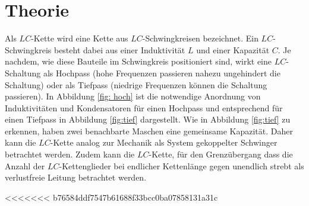 \section{Theorie}
\label{sec:Theorie}
Als $LC$-Kette wird eine Kette aus $LC$-Schwingkreisen bezeichnet.
Ein $LC$-Schwingkreis besteht dabei aus einer Induktivität $L$ und einer Kapazität $C$. Je nachdem, wie diese Bauteile
im Schwingkreis positioniert sind, wirkt eine $LC$-Schaltung als Hochpass (hohe Frequenzen passieren nahezu ungehindert die Schaltung)
oder als Tiefpass (niedrige Frequenzen können die Schaltung passieren).
In Abbildung \ref{fig: hoch} ist die notwendige Anordnung von Induktivitäten
und Kondensatoren für einen Hochpass und entsprechend für einen Tiefpass in Abbildung \ref{fig:tief} dargestellt.
Wie in Abbildung \ref{fig:tief} zu erkennen, haben zwei benachbarte Maschen eine gemeinsame Kapazität. Daher kann die $LC$-Kette analog zur
Mechanik als System gekoppelter Schwinger betrachtet werden.
Zudem kann die $LC$-Kette, für den Grenzübergang dass die Anzahl der $LC$-Kettenglieder bei endlicher Kettenlänge gegen unendlich strebt als verlustfreie Leitung betrachtet werden.

<<<<<<< b76584ddf7547b61688f33bcc0ba07858131a31c
